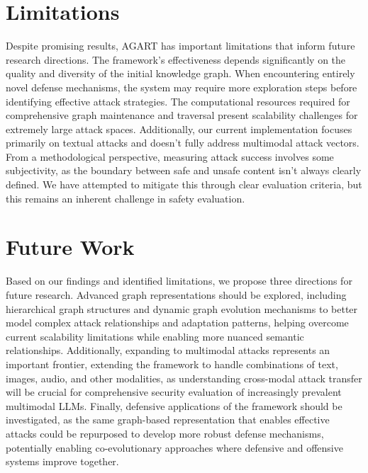 \section{Limitations}
Despite promising results, AGART has important limitations that inform future research directions. 
The framework's effectiveness depends significantly on the quality and diversity of the initial knowledge graph. When encountering entirely novel defense mechanisms, the system may require more exploration steps before identifying effective attack strategies.
The computational resources required for comprehensive graph maintenance and traversal present scalability challenges for extremely large attack spaces. Additionally, our current implementation focuses primarily on textual attacks and doesn't fully address multimodal attack vectors.
From a methodological perspective, measuring attack success involves some subjectivity, as the boundary between safe and unsafe content isn't always clearly defined. We have attempted to mitigate this through clear evaluation criteria, but this remains an inherent challenge in safety evaluation.

\section{Future Work}
Based on our findings and identified limitations, we propose three directions for future research. Advanced graph representations should be explored, including hierarchical graph structures and dynamic graph evolution mechanisms to better model complex attack relationships and adaptation patterns, helping overcome current scalability limitations while enabling more nuanced semantic relationships. Additionally, expanding to multimodal attacks represents an important frontier, extending the framework to handle combinations of text, images, audio, and other modalities, as understanding cross-modal attack transfer will be crucial for comprehensive security evaluation of increasingly prevalent multimodal LLMs. Finally, defensive applications of the framework should be investigated, as the same graph-based representation that enables effective attacks could be repurposed to develop more robust defense mechanisms, potentially enabling co-evolutionary approaches where defensive and offensive systems improve together.

